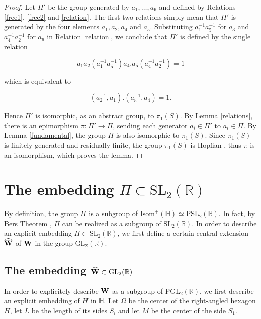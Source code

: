 \documentclass[12pt]{amsart}
\newcommand{\HP}{\mathbb{H}}
\newcommand{\R}{\mathbb{R}}
\newcommand{\GL}{{\mathrm {GL}}}
\newcommand{\Isom}{\mathrm{Isom}}
\newcommand{\PGL}{{\mathrm {PGL}}}
\newcommand{\PSL}{{\mathrm {PSL}}}
\newcommand{\SL}{{\mathrm {SL}}}
\begin{document}
\begin{proof} Let $\Pi'$ be the group  generated by $a_1,\ldots, a_6$
and defined by Relations  \ref{free1}, \ref{free2} and \ref{relation}.
The first two 
relations simply
mean that
$\Pi'$ is generated by the four elements $a_1, a_2, a_4$ and $a_5$. Substituting $a_1^{-1}a_5^{-1}$ for $a_3$ and 
$a_4^{-1}a_2^{-1}$ for $a_6$ in Relation \ref{relation},
we conclude that $\Pi'$ is defined by the single relation

$$a_1a_2(a_1^{-1}a_5^{-1})a_4.a_5
(a_4^{-1}a_2^{-1})=1$$

\noindent which is equivalent to

$$(a_2^{-1}, a_1).(a_5^{-1}, a_4)=1.$$

\noindent Hence $\Pi'$ is isomorphic, as an abstract group,  to $\pi_1(S)$. By Lemma
\ref{relations}, there is  an epimorphism  $\pi:\Pi'\to \Pi$, sending each generator $a_i\in \Pi'$ to
$a_i\in\Pi$. By Lemma \ref{fundamental}, the group $\Pi$ is also isomorphic to $\pi_1(S)$.
Since $\pi_1(S)$ is finitely generated and residually finite, 
the group $\pi_1(S)$ is Hopfian \cite{Malcev}, thus
$\pi$ is an isomorphism, which proves the lemma.
\end{proof}






\section{The embedding $\Pi\subset \SL_2(\R)$}

By definition, the  group $\Pi$ is a subgroup
of $\Isom^+(\HP)\simeq \PSL_2(\R)$. In fact, by Bers Theorem
\cite{Bers}, $\Pi$ can be realized as a subgroup of
$\SL_2(\R)$. 
In order to describe an explicit
embedding $\Pi\subset\SL_2(\R)$, we first define  a certain central extension
$\widehat{\bf W}$ of $\bf{W}$ in the group
$\GL_2(\R)$.





\subsection{The embedding $\widehat{\bf W}\subset \GL_2(\R)$}

In order to explicitely describe $\bf{W}$ as a subgroup of $\PGL_2(\R)$,
we first describe an explicit embedding of $H$ in $\HP$.
Let $\Omega$ be the center of the right-angled hexagon $H$,
let $L$ be the length of its sides $S_i$  and let $M$ be the center of the side $S_1$.
\end{document}
